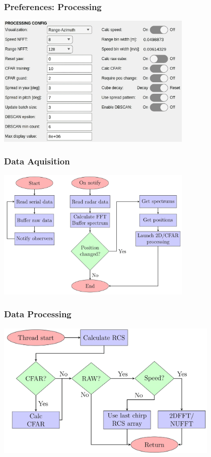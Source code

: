 \documentclass[aspectratio=169]{beamer}
\begin{document}
\begin{frame}[fragile]
  \frametitle{Preferences: Processing}
  \begin{center}
    \includegraphics[width=0.7\textwidth]{../img/preferences_crop2.png}
  \end{center}
\end{frame}

\begin{frame}[fragile]
  \frametitle{Data Aquisition}
  \begin{center}
    \includegraphics[width=0.7\textwidth]{../img/dataflow_1.png}
  \end{center}
\end{frame}

\begin{frame}[fragile]
  \frametitle{Data Processing}
  \begin{center}
    \includegraphics[width=0.8\textwidth]{../img/dataflow_2.png}
  \end{center}
\end{frame}
\end{document}
